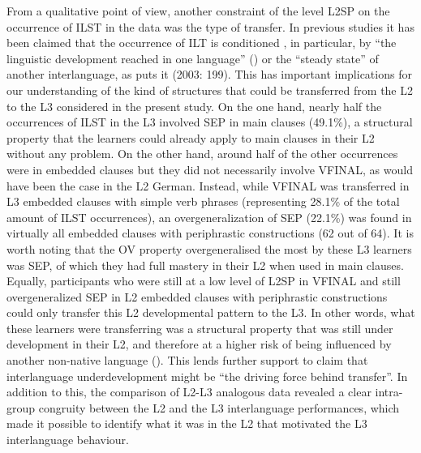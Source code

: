 \documentclass[output=paper,modfonts,nonflat, newtxmath]{langsci/langscibook}
\begin{document}
From a qualitative point of view, another constraint of the level L2SP on the occurrence of ILST in the data was the type of transfer. In previous studies it has been claimed that the occurrence of ILT is conditioned \citep{Bouvy2000}, in particular, by “the linguistic development reached in one language” (\citealt[115]{DeAngelis2007}) or the “steady state” of another interlanguage, as \citeauthor{Leung2003} puts it (2003: 199). This has important implications for our understanding of the kind of structures that could be transferred from the L2 to the L3 considered in the present study. On the one hand, nearly half the occurrences of ILST in the L3 involved SEP in main clauses (49.1\%), a structural property that the learners could already apply to main clauses in their L2 without any problem. On the other hand, around half of the other occurrences were in embedded clauses but they did not necessarily involve VFINAL, as would have been the case in the L2 German. Instead, while VFINAL was transferred in L3 embedded clauses with simple verb phrases (representing 28.1\% of the total amount of ILST occurrences), an overgeneralization of SEP (22.1\%) was found in virtually all embedded clauses with periphrastic constructions (62 out of 64). It is worth noting that the OV property overgeneralised the most by these L3 learners was SEP, of which they had full mastery in their L2 when used in main clauses. Equally, participants who were still at a low level of L2SP in VFINAL and still overgeneralized SEP in L2 embedded clauses with periphrastic constructions could only transfer this L2 developmental pattern to the L3. In other words, what these learners were transferring was a structural property that was still under development in their L2, and therefore at a higher risk of being influenced by another non-native language (\citealt{Groseva1998, Sánchez2011}). This lends further support to  claim that interlanguage underdevelopment might be “the driving force behind transfer”. In addition to this, the comparison of L2-L3 analogous data revealed a clear intra-group congruity \citep{Jarvis2000} between the L2 and the L3 interlanguage performances, which made it possible to identify what it was in the L2 that motivated the L3 interlanguage behaviour.

{\sloppy\printbibliography[heading=subbibliography,notkeyword=this]}
\end{document}
